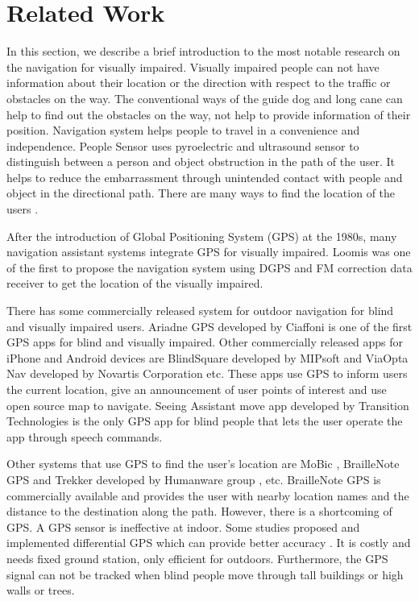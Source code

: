 \chapter{Related Work}
\label{c:relw}

In this section, we describe a brief introduction to the most notable research on the navigation for visually impaired.
Visually impaired people can not have information about their location or the direction with respect to the traffic or obstacles on the way.
The conventional ways of the guide dog and long cane can help to find out the obstacles on the way, not help to provide information of their position.
Navigation system helps people to travel in a convenience and independence.
People Sensor \cite{peoplesensor} uses pyroelectric and ultrasound sensor to distinguish between a person and object obstruction in the path of the user.
It helps to reduce the embarrassment through unintended contact with people and object in the directional path.
There are many ways to find the location of the users \cite{survey}.

After the introduction of Global Positioning System (GPS) at the 1980s, many navigation assistant systems integrate GPS for visually impaired.
Loomis \cite{loomis1,loomis,loomis2} was one of the first to propose the navigation system using DGPS and FM correction data receiver to get the location of the visually impaired.

There has some commercially released system for outdoor navigation for blind and visually impaired users.
Ariadne GPS \cite{arigps} developed by Ciaffoni is one of the first GPS apps for blind and visually impaired.
Other commercially released apps for iPhone and Android devices are BlindSquare \cite{blindsq} developed by MIPsoft and ViaOpta Nav \cite{viaopta} developed by Novartis Corporation etc.
These apps use GPS to inform users the current location, give an announcement of user points of interest and use open source map to navigate.
Seeing Assistant move app \cite{seeing} developed by Transition Technologies is the only GPS app for blind people that lets the user operate the app through speech commands.

Other systems that use GPS to find the user’s location are MoBic \cite{mobic}, BrailleNote GPS and Trekker developed by Humanware group \cite{human}, etc. BrailleNote GPS is commercially available and provides the user with nearby location names and the distance to the destination along the path. 
However, there is a shortcoming of GPS.
A GPS sensor is ineffective at indoor.
Some studies proposed and implemented differential GPS which can provide better accuracy \cite{drishti2,gps}.
It is costly and needs fixed ground station, only efficient for outdoors.
Furthermore, the GPS signal can not be tracked when blind people move through tall buildings or high walls or trees.

